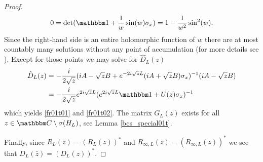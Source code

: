 \begin{proof}
\begin{equation*}
  0 = \det( \id + \frac{1}{w}\sin(w)\sigma_x ) = 1 - \frac{1}{w^2}\sin^2(w) .
\end{equation*}
Since the right-hand side is an entire holomorphic function of $w$ there are at most countably many solutions 
without any point of accumulation (for more details see \cite{BurnistonSiewert1973a}).
Except for those points we may solve for $\hat D_L(z)$
\begin{equation*}
\begin{split}
  \hat D_L(z) & = -\frac{i}{2\sqrt{z}}( iA-\sqrt{z}B + e^{-2i\sqrt{z}L}(iA+\sqrt{z}B)\sigma_x)^{-1}(iA-\sqrt{z}B)\\
         & = -\frac{i}{2\sqrt{z}} e^{2i\sqrt{z}L} ( e^{2i\sqrt{z}L} \id + U(z)\sigma_x )^{-1}
\end{split}
\end{equation*}
which yields \eqref{fr01t01} and \eqref{fr01t02}. The matrix $G_L(z)$ exists for all $z\in\C\setminus\sigma(H_L)$, 
see Lemma \ref{bcs_special01t}.

Finally, since $R_L(\bar{z}) = (R_L(z))^*$ and $R_{\infty,L}(\bar{z}) = (R_{\infty,L}(z))^*$ we see that $D_L(\bar{z})=(D_L(z))^*$.
\end{proof}
